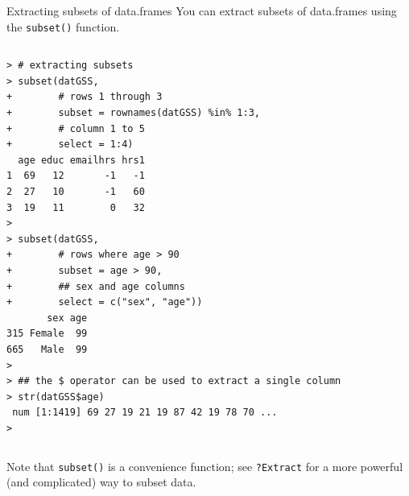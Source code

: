 \documentclass[table,smaller]{beamer}
\begin{document}
\begin{frame}[fragile,label=sec-6-4]{Extracting subsets of data.frames}
 You can extract subsets of data.frames using the \texttt{subset()} function.

\vspace{-.5em}
\begin{columns}
\begin{block}{}
\begin{verbatim}
> # extracting subsets
> subset(datGSS,
+        # rows 1 through 3
+        subset = rownames(datGSS) %in% 1:3,
+        # column 1 to 5
+        select = 1:4)
  age educ emailhrs hrs1
1  69   12       -1   -1
2  27   10       -1   60
3  19   11        0   32
>                                         
> subset(datGSS,
+        # rows where age > 90
+        subset = age > 90,
+        ## sex and age columns
+        select = c("sex", "age"))
       sex age
315 Female  99
665   Male  99
> 
> ## the $ operator can be used to extract a single column
> str(datGSS$age)
 num [1:1419] 69 27 19 21 19 87 42 19 78 70 ...
>
\end{verbatim}
\end{block}
\end{columns}
\vspace{.5em}

Note that \texttt{subset()} is a convenience function; see \texttt{?Extract} for a more powerful (and complicated) way to subset data.
\end{frame}
\end{document}
